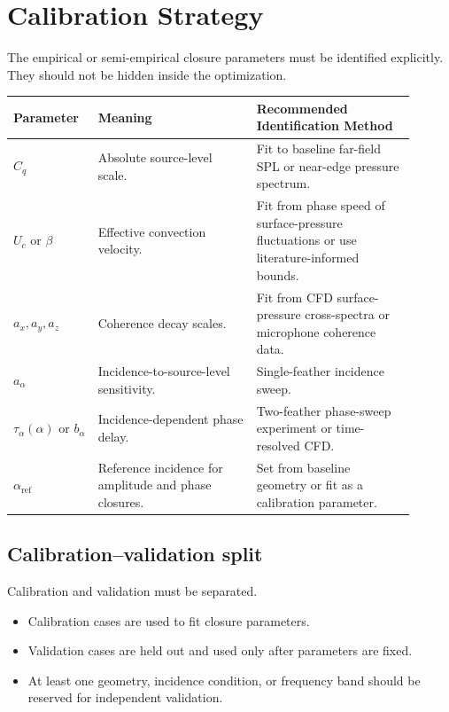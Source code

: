 \documentclass[11pt]{article}
\begin{document}
\section{Calibration Strategy}

The empirical or semi-empirical closure parameters must be identified explicitly. They should not be hidden inside the optimization.

\begin{longtable}{p{0.18\linewidth} p{0.36\linewidth} p{0.36\linewidth}}
\toprule
\textbf{Parameter} & \textbf{Meaning} & \textbf{Recommended Identification Method} \\
\midrule
\endhead

$C_q$
&
Absolute source-level scale.
&
Fit to baseline far-field SPL or near-edge pressure spectrum.
\\

$U_c$ or $\beta$
&
Effective convection velocity.
&
Fit from phase speed of surface-pressure fluctuations or use literature-informed bounds.
\\

$a_x,a_y,a_z$
&
Coherence decay scales.
&
Fit from CFD surface-pressure cross-spectra or microphone coherence data.
\\

$a_{\alpha}$
&
Incidence-to-source-level sensitivity.
&
Single-feather incidence sweep.
\\

$\tau_{\alpha}(\alpha)$ or $b_{\alpha}$
&
Incidence-dependent phase delay.
&
Two-feather phase-sweep experiment or time-resolved CFD.
\\

$\alpha_{\mathrm{ref}}$
&
Reference incidence for amplitude and phase closures.
&
Set from baseline geometry or fit as a calibration parameter.
\\

\bottomrule
\end{longtable}

\subsection{Calibration--validation split}

Calibration and validation must be separated.

\begin{itemize}
    \item Calibration cases are used to fit closure parameters.
    \item Validation cases are held out and used only after parameters are fixed.
    \item At least one geometry, incidence condition, or frequency band should be reserved for independent validation.
\end{itemize}
\end{document}
